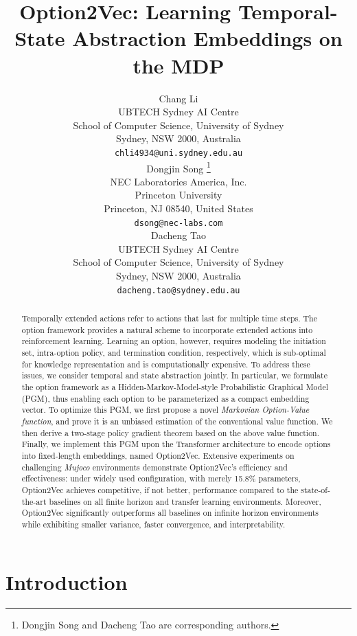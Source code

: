 \documentclass{article}
\title{Option2Vec: Learning Temporal-State Abstraction Embeddings
  on the MDP}
\author{%
  Chang Li\\
  UBTECH Sydney AI Centre\\
  School of Computer Science, University of Sydney\\
  Sydney, NSW 2000, Australia\\
  \texttt{chli4934@uni.sydney.edu.au}\\
\And
Dongjin Song \thanks{Dongjin Song and Dacheng Tao are corresponding authors.} \\
NEC Laboratories America, Inc.\\
Princeton University\\
Princeton, NJ 08540, United States\\
\texttt{dsong@nec-labs.com} \\
\AND
Dacheng Tao \footnotemark[1]\\
  UBTECH Sydney AI Centre\\
  School of Computer Science, University of Sydney\\
  Sydney, NSW 2000, Australia\\
  \texttt{dacheng.tao@sydney.edu.au}
}
\begin{document}
\maketitle

\begin{abstract}
  Temporally extended actions refer to actions that last for
  multiple time steps. The option framework provides a natural
  scheme to incorporate extended actions into reinforcement
  learning. Learning an option, however, requires modeling
  the initiation set, intra-option policy, and termination
  condition, respectively, which is sub-optimal for knowledge
  representation and is computationally expensive. To address
  these issues, we consider temporal and state
  abstraction jointly. In particular, we formulate the option framework as
  a Hidden-Markov-Model-style Probabilistic Graphical Model
  (PGM), thus enabling each option to be parameterized as a
  compact embedding vector. To optimize this PGM, we first propose a novel \emph{Markovian
  Option-Value function}, and prove it is an unbiased estimation of the
  conventional value function. We then derive a two-stage policy
  gradient theorem based on the above value function. Finally, we implement this PGM upon the Transformer architecture to encode options into fixed-length embeddings, named Option2Vec.
  Extensive experiments on challenging \textit{Mujoco} environments
  demonstrate Option2Vec's efficiency and effectiveness: under
  widely used configuration, with merely 15.8\% parameters,
  Option2Vec achieves competitive, if not better, performance compared to the state-of-the-art
  baselines on all finite horizon and transfer learning
  environments. Moreover, Option2Vec significantly outperforms
  all baselines on infinite horizon environments while exhibiting
  smaller variance, faster convergence, and interpretability.
\end{abstract}

\section{Introduction}
\label{sec:intro}
\end{document}
